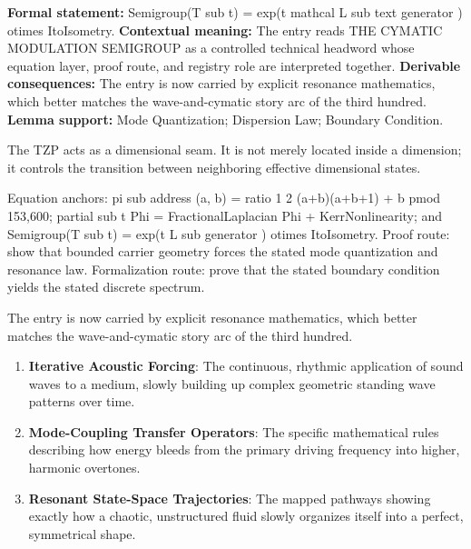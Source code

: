 \begingroup\footnotesize\setlength{\emergencystretch}{3em}\sloppy
\textbf{Formal statement:} Semigroup(T sub t) = exp(t mathcal L sub text generator ) otimes ItoIsometry. \textbf{Contextual meaning:} The entry reads THE CYMATIC MODULATION SEMIGROUP as a controlled technical headword whose equation layer, proof route, and registry role are interpreted together. \textbf{Derivable consequences:} The entry is now carried by explicit resonance mathematics, which better matches the wave-and-cymatic story arc of the third hundred. \textbf{Lemma support:} Mode Quantization; Dispersion Law; Boundary Condition.\par
\endgroup

The TZP acts as a dimensional seam. It is not merely located inside a dimension; it controls the transition between neighboring effective dimensional states.

Equation anchors: pi sub address (a, b) = ratio 1 2 (a+b)(a+b+1) + b pmod 153,600; partial sub t Phi = FractionalLaplacian Phi + KerrNonlinearity; and Semigroup(T sub t) = exp(t L sub generator ) otimes ItoIsometry. Proof route: show that bounded carrier geometry forces the stated mode quantization and resonance law. Formalization route: prove that the stated boundary condition yields the stated discrete spectrum.

The entry is now carried by explicit resonance mathematics, which better matches the wave-and-cymatic story arc of the third hundred.
\endgroup

\begin{enumerate}[leftmargin=1.6em,itemsep=6pt,topsep=4pt]
\item \textbf{Iterative Acoustic Forcing}: The continuous, rhythmic application of sound waves to a medium, slowly building up complex geometric standing wave patterns over time.
\item \textbf{Mode-Coupling Transfer Operators}: The specific mathematical rules describing how energy bleeds from the primary driving frequency into higher, harmonic overtones.
\item \textbf{Resonant State-Space Trajectories}: The mapped pathways showing exactly how a chaotic, unstructured fluid slowly organizes itself into a perfect, symmetrical shape.
\end{enumerate}


